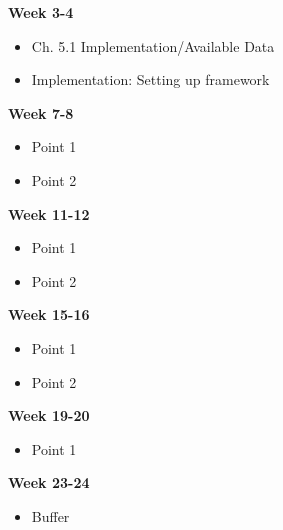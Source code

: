 \documentclass[a4paper,11pt]{article}
\begin{document}
\begin{minipage}[t]{.45\textwidth}
    \textbf{Week 3-4}
    \begin{itemize}
        \item Ch. 5.1 Implementation/Available Data
        \item Implementation: Setting up framework
    \end{itemize}
    \textbf{Week 7-8}
    \begin{itemize}
        \item Point 1
        \item Point 2
    \end{itemize}
    \textbf{Week 11-12}
    \begin{itemize}
        \item Point 1
        \item Point 2
    \end{itemize}
    \textbf{Week 15-16}
    \begin{itemize}
        \item Point 1
        \item Point 2
    \end{itemize}
    \textbf{Week 19-20}
    \begin{itemize}
        \item Point 1    
    \end{itemize}
    \textbf{Week 23-24}
    \begin{itemize}
        \item Buffer
    \end{itemize}
\end{minipage}
\end{document}

